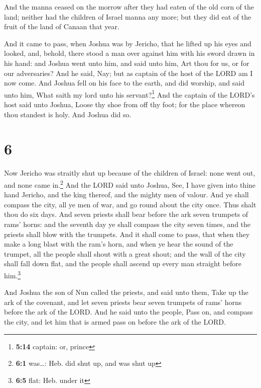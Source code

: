  And the manna ceased on the morrow after they had eaten
of the old corn of the land; neither had the children of Israel manna
any more; but they did eat of the fruit of the land of Canaan that year.

 And it came to pass, when Joshua was by Jericho, that he
lifted up his eyes and looked, and, behold, there stood a man over
against him with his sword drawn in his hand: and Joshua went unto him,
and said unto him, Art thou for us, or for our adversaries?
 And he said, Nay; but as captain of the host of the LORD
am I now come. And Joshua fell on his face to the earth, and did
worship, and said unto him, What saith my lord unto his
servant?\footnote{\textbf{5:14} captain: or, prince}  And
the captain of the LORD's host said unto Joshua, Loose thy shoe from off
thy foot; for the place whereon thou standest is holy. And Joshua did
so.

\hypertarget{section-5}{%
\section{6}\label{section-5}}

 Now Jericho was straitly shut up because of the children
of Israel: none went out, and none came in.\footnote{\textbf{6:1}
  was\ldots: Heb. did shut up, and was shut up}  And the
LORD said unto Joshua, See, I have given into thine hand Jericho, and
the king thereof, and the mighty men of valour.  And ye
shall compass the city, all ye men of war, and go round about the city
once. Thus shalt thou do six days.  And seven priests
shall bear before the ark seven trumpets of rams' horns: and the seventh
day ye shall compass the city seven times, and the priests shall blow
with the trumpets.  And it shall come to pass, that when
they make a long blast with the ram's horn, and when ye hear the sound
of the trumpet, all the people shall shout with a great shout; and the
wall of the city shall fall down flat, and the people shall ascend up
every man straight before him.\footnote{\textbf{6:5} flat: Heb. under it}

 And Joshua the son of Nun called the priests, and said
unto them, Take up the ark of the covenant, and let seven priests bear
seven trumpets of rams' horns before the ark of the LORD. 
And he said unto the people, Pass on, and compass the city, and let him
that is armed pass on before the ark of the LORD.

